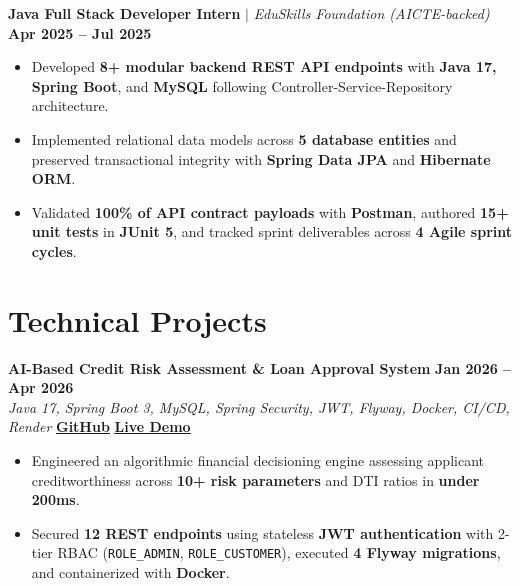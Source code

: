 \documentclass[a4paper,10pt]{article}
\begin{document}
\vspace{1pt}

\noindent
\textbf{Java Full Stack Developer Intern} \;$|$\; \textit{EduSkills Foundation (AICTE-backed)} \hfill \textbf{Apr 2025 -- Jul 2025}
\begin{itemize}
    \item Developed \textbf{8+ modular backend REST API endpoints} with \textbf{Java 17, Spring Boot}, and \textbf{MySQL} following Controller-Service-Repository architecture.
    \item Implemented relational data models across \textbf{5 database entities} and preserved transactional integrity with \textbf{Spring Data JPA} and \textbf{Hibernate ORM}.
    \item Validated \textbf{100\% of API contract payloads} with \textbf{Postman}, authored \textbf{15+ unit tests} in \textbf{JUnit 5}, and tracked sprint deliverables across \textbf{4 Agile sprint cycles}.
\end{itemize}

\vspace{1pt}

\section*{Technical Projects}

\noindent
\textbf{AI-Based Credit Risk Assessment \& Loan Approval System} \hfill \textbf{Jan 2026 -- Apr 2026}\\
\textit{Java 17, Spring Boot 3, MySQL, Spring Security, JWT, Flyway, Docker, CI/CD, Render} \hfill
\href{https://github.com/Rohith-04-04/AI-Based-Credit-Risk-Assessment-and-Loan-Approval-System-}{\textbf{\underline{GitHub}}} \;\textbar\;
\href{https://ai-based-credit-risk-assessment-and-loan-tyib.onrender.com}{\textbf{\underline{Live Demo}}}
\begin{itemize}
    \item Engineered an algorithmic financial decisioning engine assessing applicant creditworthiness across \textbf{10+ risk parameters} and DTI ratios in \textbf{under 200ms}.
    \item Secured \textbf{12 REST endpoints} using stateless \textbf{JWT authentication} with 2-tier RBAC (\texttt{ROLE\_ADMIN}, \texttt{ROLE\_CUSTOMER}), executed \textbf{4 Flyway migrations}, and containerized with \textbf{Docker}.
\end{itemize}

\vspace{2pt}
\end{document}
